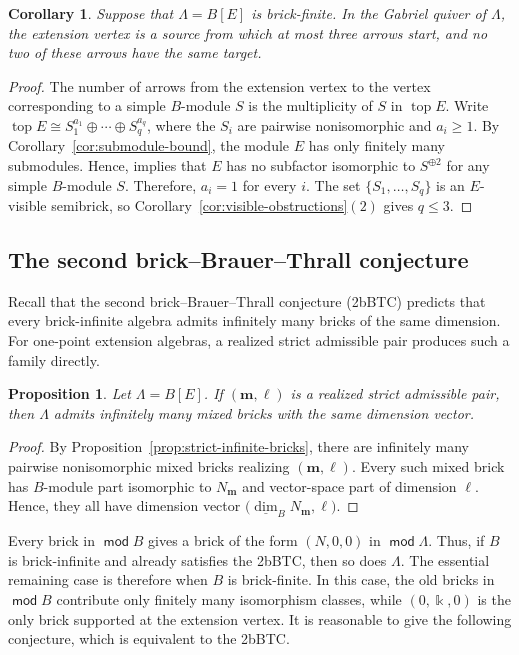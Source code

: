 \documentclass[a4,12pt]{amsart}
\numberwithin{equation}{section} %
\def\top{\operatorname{top}} %
\def\mod{\operatorname{\mathsf{mod}}}
\newtheorem{corollary}[theorem]{Corollary} %
\newtheorem{proposition}[theorem]{Proposition} %
\theoremstyle{definition} %
\begin{document}
\begin{corollary}
Suppose that $\Lambda=B[E]$ is brick-finite. In the Gabriel quiver of $\Lambda$, the extension vertex is a source from which at most three arrows start, and no two of these arrows have the same target.
\end{corollary}
\begin{proof}
The number of arrows from the extension vertex to the vertex
corresponding to a simple $B$-module $S$ is the multiplicity of $S$
in $\top E$. Write $\top E\cong S_1^{a_1}\oplus\cdots\oplus S_q^{a_q}$, where the $S_i$ are pairwise nonisomorphic and $a_i\geq1$. By
Corollary~\ref{cor:submodule-bound}, the module $E$ has only finitely
many submodules. Hence, \cite[Theorem~2.2]{Iovanov-Koffi-2022}
implies that $E$ has no subfactor isomorphic to $S^{\oplus2}$ for
any simple $B$-module $S$. Therefore, $a_i=1$ for every $i$.
The set $\{S_1,\ldots,S_q\}$ is an $E$-visible semibrick, so
Corollary~\ref{cor:visible-obstructions}$(2)$ gives $q\leq3$.
\end{proof}

\subsection{The second brick--Brauer--Thrall conjecture}
Recall that the second brick--Brauer--Thrall conjecture (2bBTC) predicts that every brick-infinite algebra admits infinitely many bricks of the same dimension. For one-point extension algebras, a realized strict admissible pair produces such a family directly.

\begin{proposition}\label{prop:strict-second-bbt}
Let $\Lambda=B[E]$. If $(\mathbf{m},\ell)$ is a realized strict admissible pair, then $\Lambda$ admits infinitely many mixed bricks with the same dimension vector.
\end{proposition}
\begin{proof}
By Proposition~\ref{prop:strict-infinite-bricks}, there are infinitely many pairwise nonisomorphic mixed bricks realizing $(\mathbf{m},\ell)$. Every such mixed brick has $B$-module part isomorphic to $N_{\mathbf{m}}$ and vector-space part of dimension $\ell$. Hence, they all have dimension vector $\bigl(\underline{\dim}_B N_{\mathbf{m}},\ell\bigr)$.
\end{proof}

Every brick in $\mod B$ gives a brick of the form $(N,0,0)$ in $\mod \Lambda$. Thus, if $B$ is brick-infinite and already satisfies the 2bBTC, then so does $\Lambda$. The essential remaining case is therefore when $B$ is brick-finite. In this case, the old bricks in $\mod B$ contribute only finitely many isomorphism classes, while $(0,\Bbbk,0)$ is the only brick supported at the extension vertex. It is reasonable to give the following conjecture, which is equivalent to the 2bBTC.
\end{document}
